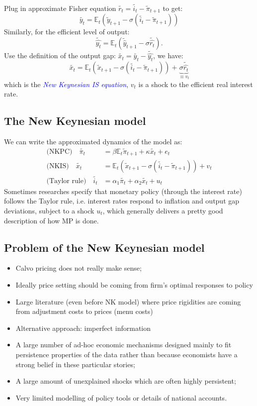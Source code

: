 Plug in approximate Fisher equation $\tilde{r_t} = \tilde{i_t} - \tilde{\pi}_{t+1}$ to get:
\[\tilde{y_t} = \mathbb{E}_t \left(\tilde{y}_{t+1} - \sigma (\tilde{i_t} - \tilde{\pi}_{t+1} ) \right)\]
Similarly, for the efficient level of output:
\[\tilde{\hat{y_t}} = \mathbb{E}_t \left(\tilde{\hat{y}}_{t+1} - \sigma \tilde{\hat{r_t}}\right).\]
Use the definition of the output gap: $\tilde{x_t} = \tilde{y_t} - \tilde{\hat{y_t}}$, we have:
\begin{equation*}\label{NKIS}
    \tilde{x_t} = \mathbb{E}_t \left(\tilde{x}_{t+1} - \sigma (\tilde{i_t} - \tilde{\pi}_{t+1}) \right) + \underset{\equiv v_t}{\underbrace{\sigma \tilde{\hat{r_t}}}}
\end{equation*}
which is the \textcolor{blue}{\textit{New Keynesian IS equation}}, $v_t$ is a shock to the efficient real interest rate.

\subsection{The New Keynesian model}
We can write the approximated dynamics of the model as:
\begin{align}
    \text{(NKPC)} \quad \tilde{\pi _t} &= \beta \mathbb{E}_t \tilde{\pi}_{t+1} + \kappa \tilde{x_t} + e_t \nonumber \\
    \text{(NKIS)} \quad \tilde{x_t} &= \mathbb{E}_t \left(\tilde{x}_{t+1} - \sigma (\tilde{i_t} - \tilde{\pi}_{t+1}) \right) + v_t \nonumber \\
    \text{(Taylor rule)} \quad \tilde{i_t} &= \alpha_1 \tilde{\pi_t} + \alpha_2 \tilde{x_t} + u_t \nonumber
\end{align}
Sometimes researches specify that monetary policy (through the
interest rate) follows the Taylor rule, i.e. interest rates respond to
inflation and output gap deviations, subject to a shock $u_t$,
which generally delivers a pretty good description of how MP is
done.

\subsection{Problem of the New Keynesian model}
\begin{itemize}
    \item Calvo pricing does not really make sense;
    \item Ideally price setting should be coming from ﬁrm's optimal
    responses to policy
    \item Large literature (even before NK model) where price rigidities
    are coming from adjustment costs to prices (menu costs)
    \item Alternative approach: imperfect information
    \item A large number of ad-hoc economic mechanisms designed mainly to fit persistence properties of
    the data rather than because economists have a strong belief in these particular stories;
    \item A large amount of unexplained shocks which are often highly persistent;
    \item Very limited modelling of policy tools or details of national accounts.
\end{itemize}